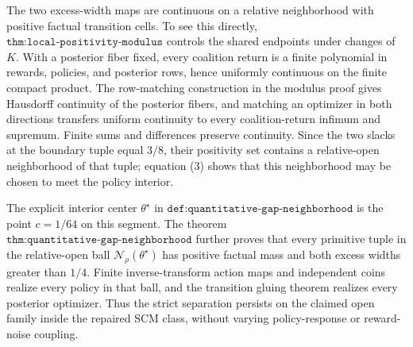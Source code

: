 The two excess-width maps are continuous on a relative neighborhood with positive factual transition cells.  To see this directly, \(\texttt{thm:local-positivity-modulus}\) controls the shared endpoints under changes of \(K\).  With a posterior fiber fixed, every coalition return is a finite polynomial in rewards, policies, and posterior rows, hence uniformly continuous on the finite compact product.  The row-matching construction in the modulus proof gives Hausdorff continuity of the posterior fibers, and matching an optimizer in both directions transfers uniform continuity to every coalition-return infimum and supremum.  Finite sums and differences preserve continuity.  Since the two slacks at the boundary tuple equal \(3/8\), their positivity set contains a relative-open neighborhood of that tuple; equation (3) shows that this neighborhood may be chosen to meet the policy interior.

The explicit interior center \(\theta^\star\) in \(\texttt{def:quantitative-gap-neighborhood}\) is the point \(c=1/64\) on this segment.  The theorem \(\texttt{thm:quantitative-gap-neighborhood}\) further proves that every primitive tuple in the relative-open ball \(\mathcal N_\rho(\theta^\star)\) has positive factual mass and both excess widths greater than \(1/4\).  Finite inverse-transform action maps and independent coins realize every policy in that ball, and the transition gluing theorem realizes every posterior optimizer.  Thus the strict separation persists on the claimed open family inside the repaired SCM class, without varying policy-response or reward-noise coupling.